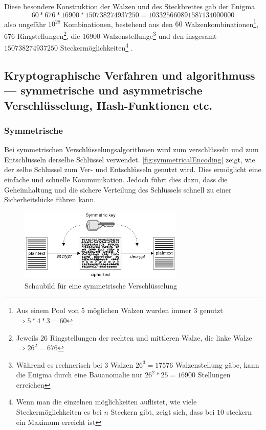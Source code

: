 \par
Diese besondere Konstruktion der Walzen und des Steckbrettes gab der Enigma
\begin{equation}
    60 * 676 * 16900 * 150738274937250 = 103325660891587134000000
\end{equation}
also ungefähr \(10^{28}\) Kombinationen, bestehend aus den \(60\) Walzenkombinationen\footnote{Aus einem Pool von 5 möglichen Walzen wurden immer 3 genutzt $\Rightarrow 5*4*3 = 60$}, \(676\) Ringstellungen\footnote{Jeweils \(26\) Ringstellungen der rechten und mittleren Walze, die linke Walze \(\Rightarrow 26^2 = 676\)}, die \(16900\) Walzenstellunge\footnote{Während es rechnerisch bei 3 Walzen \(26^3 = 17576\) Walzenstellung gäbe, kann die Enigma durch eine Bauanomalie nur \(26^2*25=16900\) Stellungen erreichen} \autocite[]{enigma_double_rotor} und den insgesamt \(150738274937250\) Steckermöglichkeiten\footnote{Wenn man die einzelnen möglichkeiten auflistet, wie viele Steckermöglichkeiten es bei $n$ Steckern gibt, zeigt sich, dass bei $10$ steckern ein Maximum erreicht ist} \autocite[\pagef~810]{anal_eval_enigma}.

\subsection[Kryptographische Verfahren und Algorithmen]{Kryptographische Verfahren und \glspl{algorithmus} — symmetrische und asymmetrische Verschlüsselung, Hash-Funktionen etc.}\label{subsec:kryptographische-verfahren-und-algorithmen}

\subsubsection[Symmetrische Verschlüsselungsalgorithmen]{Symmetrische }\label{subsubsec:symmetrsiche-algorithmen}
Bei symmetrischen Verschlüsselungsalgorithmen wird zum verschlüsseln und zum Entschlüsseln derselbe Schlüssel verwendet. \autoref{fig:symmetricalEncoding}\autocite{Chapter211:online} zeigt, wie der selbe Schlussel zum Ver- und Entschlüsseln genutzt wird. Dies ermöglicht eine einfache und schnelle Kommunikation. Jedoch führt dies  dazu, dass die Geheimhaltung und die sichere Verteilung des Schlüssels schnell zu einer Sicherheitslücke führen kann.

\begin{figure}[htbp]
	\includegraphics[width=0.7\textwidth]{abbildungen/symmetricEncoding.png}
	\centering
	\caption[
	Schaubild für eine symmetrische Verschlüsselung]{Schaubild für eine symmetrische Verschlüsselung\footnotemark}
	\label{fig:symmetricalEncoding}
\end{figure}


